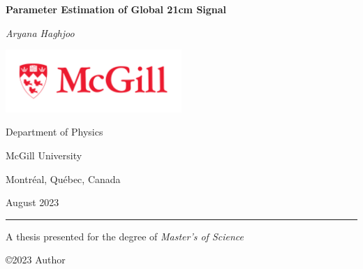 \documentclass[12pt, TexShade, letterpaper]{report}
\author{\textcopyright Author, August, 2020}
\date{}
\renewcommand{\chaptermark}[1]{\markboth{#1}{}} %
\begin{document}
\begin{titlepage}
		\begin{center}
			\vspace*{0.5cm}

			\LARGE
			\textbf{Parameter Estimation of Global 21cm Signal}
			\vspace{1cm}
			
			\textit{Aryana Haghjoo}
			
			\vspace{2cm}
			
			\includegraphics[width=0.5\textwidth]{McGill_logo.png}
			
			\vspace{2cm}
			
			\Large
			Department of Physics
			
			\vspace{-5mm}
			McGill University
			
			\vspace{-5mm}
			Montr\'eal, Qu\'ebec, Canada
			
			\vspace{5mm}
			August 2023
			\small
			\vspace{0.5cm}
			{\color{red} \hrule height 0.75mm}
			
			\vspace{0.2cm}
			
			A thesis presented for the degree of
			\emph{Master's of Science}
		
			\copyright\hspace{0.5mm}2023 Author
			
		\end{center}
	\end{titlepage}
\setlength{\voffset}{2cm}
\renewcommand{\chaptermark}[1]{%
	\markboth{\thechapter.\ #1}{}}
\end{document}
